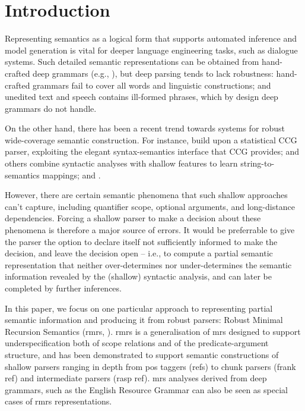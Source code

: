 \section{Introduction} \label{sec:intro}

Representing semantics as a logical form that supports automated
inference and model generation is vital for deeper language
engineering tasks, such as dialogue systems.  Such detailed semantic
representations can be obtained from hand-crafted deep grammars (e.g.,
\cite{butt:etal:1999,copestake:flickinger:2000}), but deep parsing
tends to lack robustness: hand-crafted grammars fail to cover all
words and linguistic constructions; and unedited text and speech
contains ill-formed phrases, which by design deep grammars do not
handle.

On the other hand, there has been a recent trend towards systems for
robust wide-coverage semantic construction.  For instance,
\cite{bos:etal:2004} build upon a statistical CCG parser, exploiting
the elegant syntax-semantics interface that CCG provides;
\cite{zettlemoyer:collins:2007} and others combine syntactic analyses
with shallow features to learn string-to-semantics mappings; and
.

However, there are certain semantic phenomena that such shallow
approaches can't capture, including quantifier scope, optional
arguments, and long-distance dependencies.  Forcing a shallow parser
to make a decision about these phenomena is therefore a major source
of errors.  It would be preferrable to give the parser the option to
declare itself not sufficiently informed to make the decision, and
leave the decision open -- i.e., to compute a partial semantic
representation that neither over-determines nor under-determines the
semantic information revealed by the (shallow) syntactic analysis, and
can later be completed by further inferences.

In this paper, we focus on one particular approach to representing
partial semantic information and producing it from robust parsers:
Robust Minimal Recursion Semantics ({\sc rmrs},
\cite{copestake:2003}).  {\sc rmrs} is a generalisation of {\sc mrs}
\cite{copestake:etal:2005} designed to support underspecification both
of scope relations and of the predicate-argument structure, and has
been demonstrated to support semantic constructions of shallow parsers
ranging in depth from {\sc pos} taggers (refs) to chunk parsers (frank
ref) and intermediate parsers ({\sc rasp} ref).  {\sc mrs} analyses
derived from deep grammars, such as the English Resource Grammar
\cite{copestake:flickinger:2000} can also be seen as special cases of
{\sc rmrs} representations.

